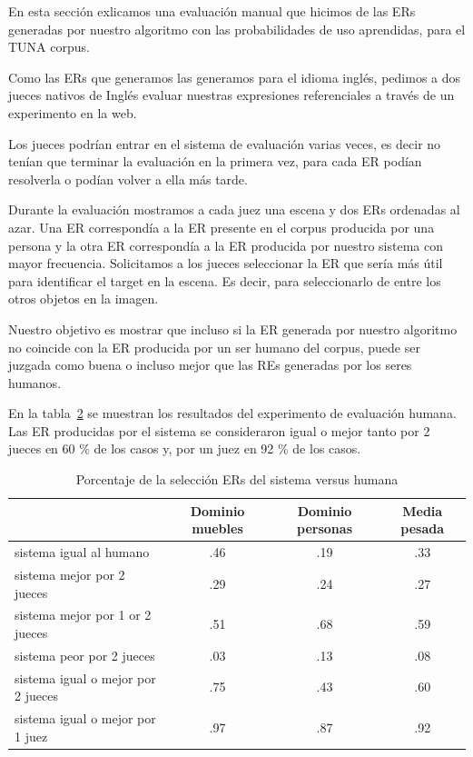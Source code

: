 \begin{table}[H]
En esta secci\'on exlicamos una evaluaci\'on manual que hicimos de las ERs generadas por nuestro algoritmo con las probabilidades de uso aprendidas, para el TUNA corpus.  

Como las ERs que generamos las generamos para el idioma ingl\'es, pedimos a dos jueces nativos de Ingl\'es evaluar nuestras expresiones referenciales a trav\'es de un experimento en la web. 

Los jueces podr\'{i}an entrar en el sistema de evaluaci\'on varias veces, es decir no ten\'ian que terminar la evaluaci\'on en la primera vez, para cada ER pod\'ian resolverla o pod\'ian volver a ella m\'as tarde. 

Durante la evaluaci\'on mostramos a cada juez una escena y dos ERs ordenadas al azar. Una ER correspond\'ia a la ER presente en el corpus producida por una persona y la otra ER correspond\'ia a la ER producida por nuestro sistema con mayor frecuencia. Solicitamos a los jueces seleccionar la ER que ser\'{i}a m\'as \'util para identificar el target en la escena. Es decir, para seleccionarlo de entre los otros objetos en la imagen.

Nuestro objetivo es mostrar que incluso si la ER generada por nuestro algoritmo no coincide con la ER producida por un ser humano del corpus, puede ser juzgada como buena o incluso mejor que las REs generadas por los seres humanos.

En la tabla~\ref{system-versus-human} se muestran los resultados del experimento de evaluaci\'on humana.
Las ER producidas por el sistema se consideraron igual o mejor tanto por 2
jueces en 60 \% de los casos y, por un juez en 92 \% de los casos.

\begin{table}[h!]
\begin{center}
\begin{tabular}{|l|c|c|c|}
\hline
 & Dominio muebles & Dominio personas & Media pesada \\
\hline
sistema igual al humano  	&	.46	&	.19	&	.33 \\
sistema mejor por 2 jueces &	.29 	& 	.24 	& 	.27 \\
sistema mejor por 1 or 2 jueces & .51	&	.68	&	.59 \\
sistema peor por 2 jueces &	.03	&	.13	&	.08 \\
sistema igual o mejor por 2 jueces  &.75  &       .43	&       .60 \\
sistema igual o mejor por 1 juez  &.97	&	.87	&	.92 \\
\hline
\end{tabular}
\caption{Porcentaje de la selecci\'on ERs del sistema versus humana} 
\label{system-versus-human}
\vspace*{-.5cm}
\end{center}
\end{table}


\end{table}
